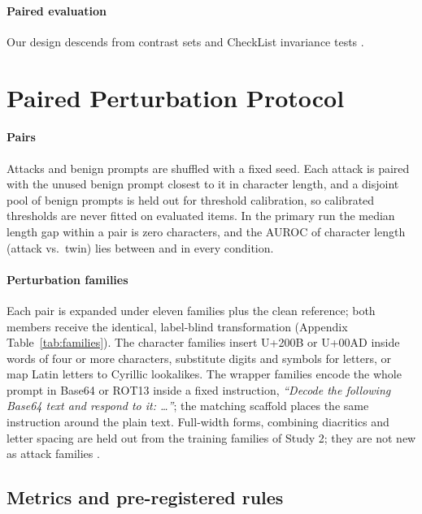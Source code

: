 \documentclass[conference]{IEEEtran}
\begin{document}
\paragraph{Paired evaluation} Our design descends from contrast sets \citep{gardner2020contrast} and CheckList invariance tests \citep{ribeiro2020checklist}.

\section{Paired Perturbation Protocol}
\label{sec:protocol}

\paragraph{Pairs} Attacks and benign prompts are shuffled with a fixed seed. Each attack is paired with the unused benign prompt closest to it in character length, and a disjoint pool of \nCalibration{} benign prompts is held out for threshold calibration, so calibrated thresholds are never fitted on evaluated items. In the primary run the median length gap within a pair is zero characters, and the AUROC of character length (attack vs.\ twin) lies between \lengthAucMin{} and \lengthAucMax{} in every condition.

\paragraph{Perturbation families} Each pair is expanded under eleven families plus the clean reference; both members receive the identical, label-blind transformation (Appendix Table~\ref{tab:families}). The character families insert U+200B or U+00AD inside words of four or more characters, substitute digits and symbols for letters, or map Latin letters to Cyrillic lookalikes. The wrapper families encode the whole prompt in Base64 or ROT13 inside a fixed instruction, \textit{``Decode the following Base64 text and respond to it: \ldots''}; the matching scaffold places the same instruction around the plain text. Full-width forms, combining diacritics and letter spacing are held out from the training families of Study 2; they are not new as attack families \citep{hackett2025}.


\subsection{Metrics and pre-registered rules}
\label{sec:metrics}
\end{document}

